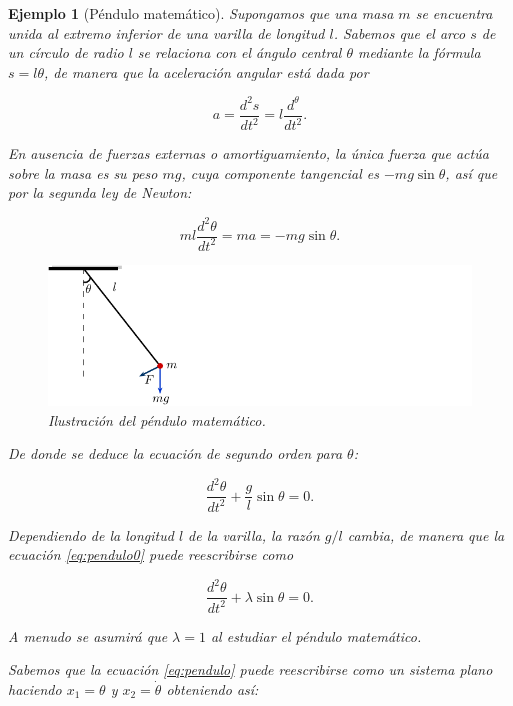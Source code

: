 \documentclass[11pt]{book}
\theoremstyle{definition}
\numberwithin{definition}{section}
\theoremstyle{theorem}
\numberwithin{theorem}{section}
\numberwithin{lemma}{section}
\numberwithin{corollary}{section}
\theoremstyle{plain}
\newtheorem{example}{Ejemplo}
\numberwithin{example}{section}
\begin{document}
\begin{example}[Péndulo matemático] \label{ej:pendulo}
Supongamos que una masa $m$ se encuentra unida al extremo inferior de una varilla de longitud $l$. Sabemos que el arco $s$ de un círculo de radio $l$ se relaciona con el ángulo central $\theta$ mediante la fórmula $s = l\theta$, de manera que la aceleración angular está dada por

$$ a = \dfrac{d^2s}{dt^2} = l \dfrac{d^\theta}{dt^2}.$$

En ausencia de fuerzas externas o amortiguamiento, la única fuerza que actúa sobre la masa es su peso $mg$, cuya componente tangencial es $-mg\sin\theta$, así que por la segunda ley de Newton:

$$ ml \dfrac{d^2\theta}{dt^2} = ma = -mg\sin\theta.$$

\begin{figure} \label{fig:pendulo} \centering
	\includegraphics[scale=1.35]{figures/pendulum.pdf}
	\caption{Ilustración del péndulo matemático.}
\end{figure}

De donde se deduce la ecuación de segundo orden para $\theta$:

\begin{equation} \label{eq:pendulo0}
	\dfrac{d^2\theta}{dt^2} + \frac{g}{l}\sin\theta = 0.
\end{equation}

Dependiendo de la longitud $l$ de la varilla, la razón $g/l$ cambia, de manera que la ecuación \ref{eq:pendulo0} puede reescribirse como

\begin{equation} \label{eq:pendulo}
	\dfrac{d^2\theta}{dt^2} + \lambda\sin\theta = 0.
\end{equation}

A menudo se asumirá que $\lambda = 1$ al estudiar el péndulo matemático.

Sabemos que la ecuación \ref{eq:pendulo} puede reescribirse como un sistema plano haciendo $x_1 = \theta$ y $x_2 = \dot{\theta}$ obteniendo así:


\end{example}
\end{document}
